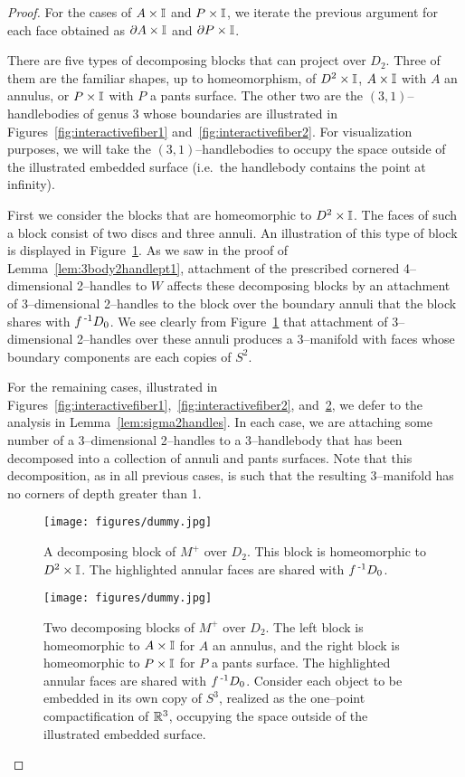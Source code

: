 \begin{proof}
	For the cases of $A\times\mathbb{I}$ and $P\times\mathbb{I}$, we iterate the previous argument for each face obtained as $\partial A\times\mathbb{I}$ and $\partial P\times\mathbb{I}$.


	There are five types of decomposing blocks that can project over $D_2$.
	Three of them are the familiar shapes, up to homeomorphism, of $D^2\times\mathbb{I}$, $A\times\mathbb{I}$ with $A$ an annulus, or $P\times\mathbb{I}$ with $P$ a pants surface.
	The other two are the $(3,1)$--handlebodies of genus 3 whose boundaries are illustrated in Figures~\ref{fig:interactivefiber1} and~\ref{fig:interactivefiber2}.
	For visualization purposes, we will take the $(3,1)$--handlebodies to occupy the space outside of the illustrated embedded surface (i.e.\ the handlebody contains the point at infinity).
	
	First we consider the blocks that are homeomorphic to $D^2\times\mathbb{I}$.
	The faces of such a block consist of two discs and three annuli.
	An illustration of this type of block is displayed in Figure~\ref{fig:blocks1}.
	As we saw in the proof of Lemma~\ref{lem:3body2handlept1}, attachment of the prescribed cornered 4--dimensional 2--handles to $W$ affects these decomposing blocks by an attachment of 3--dimensional 2--handles to the block over the boundary annuli that the block shares with $f^{\,\text{-}1} D_0$.
	We see clearly from Figure~\ref{fig:blocks1} that attachment of 3--dimensional 2--handles over these annuli produces a 3--manifold with faces whose boundary components are each copies of $S^2$.
	
	For the remaining cases, illustrated in Figures~\ref{fig:interactivefiber1},~\ref{fig:interactivefiber2}, and~\ref{fig:blocks2}, we defer to the analysis in Lemma~\ref{lem:sigma2handles}.
	In each case, we are attaching some number of a 3--dimensional 2--handles to a 3--handlebody that has been decomposed into a collection of annuli and pants surfaces.
	Note that this decomposition, as in all previous cases, is such that the resulting 3--manifold has no corners of depth greater than 1.
	
	\begin{figure}
		\centering
		\caption{A decomposing block of $M^+$ over $D_2$.  This block is homeomorphic to $D^2\times\mathbb{I}$.  The highlighted annular faces are shared with $f^{\,\text{-}1} D_0$.}
		\texttt{[image: figures/dummy.jpg]}
		\label{fig:blocks1}
	\end{figure}
	
	
	\begin{figure}
		\centering
		\caption{Two decomposing blocks of $M^+$ over $D_2$.  The left block is homeomorphic to $A\times\mathbb{I}$ for $A$ an annulus, and the right block is homeomorphic to $P\times\mathbb{I}$ for $P$ a pants surface.  The highlighted annular faces are shared with $f^{\,\text{-}1} D_0$.  Consider each object to be embedded in its own copy of $S^3$, realized as the one--point compactification of $\mathbb{R}^3$, occupying the space outside of the illustrated embedded surface.}
		\texttt{[image: figures/dummy.jpg]}
		\label{fig:blocks2}
	\end{figure}
\end{proof}


